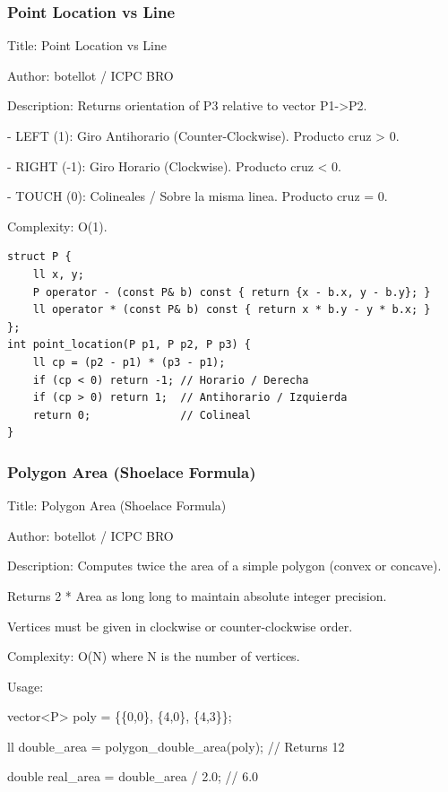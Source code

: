\documentclass[10pt,landscape,twocolumn]{article}
\begin{document}
\subsubsection{Point Location vs Line}
\begin{flushleft}
\footnotesize\ttfamily
\par\noindent Title: Point Location vs Line
\par\noindent Author: botellot / ICPC BRO
\par\noindent Description: Returns orientation of P3 relative to vector P1-\textgreater{}P2.
\par\noindent - LEFT (1): Giro Antihorario (Counter-Clockwise). Producto cruz \textgreater{} 0.
\par\noindent - RIGHT (-1): Giro Horario (Clockwise). Producto cruz \textless{} 0.
\par\noindent - TOUCH (0): Colineales / Sobre la misma linea. Producto cruz = 0.
\par\noindent Complexity: O(1).
\end{flushleft}

\begin{lstlisting}
struct P {
    ll x, y;
    P operator - (const P& b) const { return {x - b.x, y - b.y}; }
    ll operator * (const P& b) const { return x * b.y - y * b.x; }
};
int point_location(P p1, P p2, P p3) {
    ll cp = (p2 - p1) * (p3 - p1);
    if (cp < 0) return -1; // Horario / Derecha
    if (cp > 0) return 1;  // Antihorario / Izquierda
    return 0;              // Colineal
}
\end{lstlisting}

\subsubsection{Polygon Area (Shoelace Formula)}
\begin{flushleft}
\footnotesize\ttfamily
\par\noindent Title: Polygon Area (Shoelace Formula)
\par\noindent Author: botellot / ICPC BRO
\par\noindent Description: Computes twice the area of a simple polygon (convex or concave).
\par\noindent Returns 2 * Area as long long to maintain absolute integer precision.
\par\noindent Vertices must be given in clockwise or counter-clockwise order.
\par\noindent Complexity: O(N) where N is the number of vertices.
\par\noindent Usage:
\par\noindent vector\textless{}P\textgreater{} poly = \{\{0,0\}, \{4,0\}, \{4,3\}\};
\par\noindent ll double\_area = polygon\_double\_area(poly); // Returns 12
\par\noindent double real\_area = double\_area / 2.0;       // 6.0
\end{flushleft}
\end{document}
